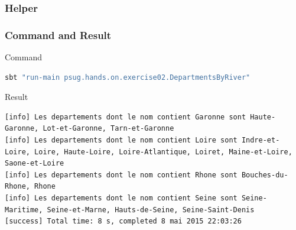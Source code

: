 \documentclass[slidetop,9pt,utf8]{beamer}
\begin{document}
\begin{frame}
  \frametitle{Helper}

  

\end{frame}

\begin{frame}[fragile]
  \frametitle{Command and Result}

  \begin{block}{Command}
    \begin{lstlisting}[language=bash, style=terminal-medium]
sbt "run-main psug.hands.on.exercise02.DepartmentsByRiver"
    \end{lstlisting}
  \end{block}

  \begin{block}{Result}
    \begin{lstlisting}[style=terminal]
[info] Les departements dont le nom contient Garonne sont Haute-Garonne, Lot-et-Garonne, Tarn-et-Garonne
[info] Les departements dont le nom contient Loire sont Indre-et-Loire, Loire, Haute-Loire, Loire-Atlantique, Loiret, Maine-et-Loire, Saone-et-Loire
[info] Les departements dont le nom contient Rhone sont Bouches-du-Rhone, Rhone
[info] Les departements dont le nom contient Seine sont Seine-Maritime, Seine-et-Marne, Hauts-de-Seine, Seine-Saint-Denis
[success] Total time: 8 s, completed 8 mai 2015 22:03:26
    \end{lstlisting}
  \end{block}

\end{frame}
\end{document}
